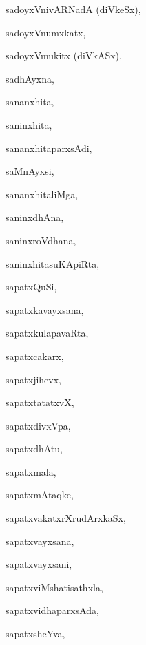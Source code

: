 \begin{multicols}{3}
{\noindent
{sadoyxVnivARNadA (diVkeSx)}, \pageref{sadoyxVnivARNadAdiVkeSx}

\noindent
{sadoyxVnumxkatx}, \pageref{sadoyxVnumxkatx}

\noindent
{sadoyxVmukitx (diVkASx)}, \pageref{sadoyxVmukitxdiVkASx}

\noindent
{sadhAyxna}, \pageref{sadhAyxna}

\noindent
{sananxhita}, \pageref{sananxhita}

\noindent
{saninxhita}, \pageref{saninxhita}

\noindent
{sananxhitaparxsAdi}, \pageref{sananxhitaparxsAdi}

\noindent
{saMnAyxsi}, \pageref{saMnAyxsi}

\noindent
{sananxhitaliMga}, \pageref{sananxhitaliMga}

\noindent
{saninxdhAna}, \pageref{saninxdhAna}

\noindent
{saninxroVdhana}, \pageref{saninxroVdhana}

\noindent
{saninxhitasuKApiRta}, \pageref{saninxhitasuKApiRta}

\noindent
{sapatxQuSi}, \pageref{sapatxQuSi}

\noindent
{sapatxkavayxsana}, \pageref{sapatxkavayxsana}

\noindent
{sapatxkulapavaRta}, \pageref{sapatxkulapavaRta}

\noindent
{sapatxcakarx}, \pageref{sapatxcakarx}

\noindent
{sapatxjihevx}, \pageref{sapatxjihevx}

\noindent
{sapatxtatatxvX}, \pageref{sapatxtatatxvX}

\noindent
{sapatxdivxVpa}, \pageref{sapatxdivxVpa}

\noindent
{sapatxdhAtu}, \pageref{sapatxdhAtu}

\noindent
{sapatxmala}, \pageref{sapatxmala}

\noindent
{sapatxmAtaqke}, \pageref{sapatxmAtaqke1}

\noindent
{sapatxvakatxrXrudArxkaSx}, \pageref{sapatxvakatxrXrudArxkaSx}

\noindent
{sapatxvayxsana}, \pageref{sapatxvayxsana}

\noindent
{sapatxvayxsani}, \pageref{sapatxvayxsani}

\noindent
{sapatxviMshatisathxla}, \pageref{sapatxviMshatisathxla}

\noindent
{sapatxvidhaparxsAda}, \pageref{sapatxvidhaparxsAda}

\noindent
{sapatxsheYva}, \pageref{sapatxsheYva}

}
\end{multicols}
